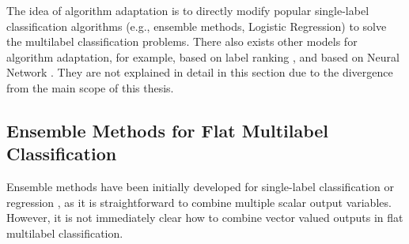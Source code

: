 {The idea of algorithm adaptation is to directly modify popular single-label classification algorithms (e.g., ensemble methods, Logistic Regression) to solve the multilabel classification problems.
There also exists other models for algorithm adaptation, for example, based on label ranking \citep{Crammer03afamily}, and based on Neural Network \citep{Zhang06multilabel}.
They are not explained in detail in this section due to the divergence from the main scope of this thesis.



%
%
\subsection{Ensemble Methods for Flat Multilabel Classification} \label{sc_emfmlc}

Ensemble methods have been initially developed for single-label classification \citep{Breiman96bagging,Freund97a} or regression \citep{Breiman96bagging}, as it is straightforward to combine multiple scalar output variables.
However, it is not immediately clear how to combine vector valued outputs in flat multilabel classification.

}
